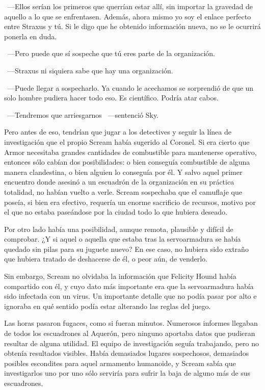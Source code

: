 ~---Ellos serían los primeros que querrían estar allí, sin importar la gravedad de aquello a lo que se enfrentasen. Además, ahora mismo yo soy el enlace perfecto entre Straxus y tú. Si le digo que he obtenido información nueva, no se le ocurrirá ponerla en duda.

~---Pero puede que sí sospeche que tú eres parte de la organización.

~---Straxus ni siquiera sabe que hay una organización.

~---Puede llegar a sospecharlo. Ya cuando le acechamos se sorprendió de que un solo hombre pudiera hacer todo eso. Es científico. Podría atar cabos.

~---Tendremos que arriesgarnos ~---sentenció Sky.

Pero antes de eso, tendrían que jugar a los detectives y seguir la línea de investigación que el propio Scream había sugerido al Coronel. Si era cierto que Armor necesitaba grandes cantidades de combustible para mantenerse operativo, entonces sólo cabían dos posibilidades: o bien conseguía combustible de alguna manera clandestina, o bien alguien lo conseguía por él. Y salvo aquel primer encuentro donde asesinó a un escuadrón de la organización en su práctica totalidad, no habían vuelto a verle. Scream sospechaba que el camuflaje que poseía, si bien era efectivo, requería un enorme sacrificio de recursos, motivo por el que no estaba paseándose por la ciudad todo lo que hubiera deseado.

Por otro lado había una posibilidad, aunque remota, plausible y difícil de comprobar. ¿Y si aquel o aquella que estaba tras la servoarmadura se había quedado sin pilas para su juguete nuevo? En ese caso, no hubiera sido extraño que hubiera tratado de deshacerse de él, o peor aún, de venderlo.

Sin embargo, Scream no olvidaba la información que Felicity Hound había compartido con él, y cuyo dato más importante era que la servoarmadura había sido infectada con un virus. Un importante detalle que no podía pasar por alto e ignoraba en qué sentido podía estar alterando las reglas del juego.

Las horas pasaron fugaces, como si fueran minutos. Numerosos informes llegaban de todos los escuadrones al Aquerón, pero ninguno aportaba datos que pudieran resultar de alguna utilidad. El equipo de investigación seguía trabajando, pero no obtenía resultados visibles. Había demasiados lugares sospechosos, demasiados posibles escondites para aquel armamento humanoide, y Scream sabía que investigarlos uno por uno sólo serviría para sufrir la baja de alguno más de sus escuadrones.

